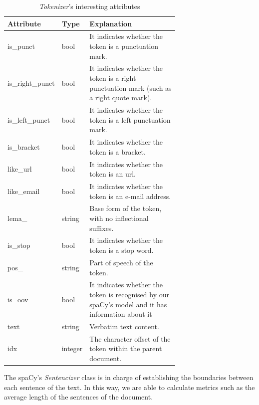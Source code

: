 \begin{table}[h]
	\begin{tabular}{|l|l|p{0.675\linewidth}|}
		\hline
		\textbf{Attribute} & \textbf{Type} & \textbf{Explanation}                                                                     \\ \hline
		is\_punct          & bool          & It indicates whether the token is a punctuation mark.                                    \\ \hline
		is\_right\_punct   & bool          & It indicates whether the token is a right punctuation mark (such as a right quote mark). \\ \hline
		is\_left\_punct    & bool          & It indicates whether the token is a left punctuation mark.                               \\ \hline
		is\_bracket        & bool          & It indicates whether the token is a bracket.                                             \\ \hline
		like\_url          & bool          & It indicates whether the token is an url.                                                \\ \hline
		like\_email        & bool          & It indicates whether the token is an e-mail address.                                     \\ \hline
		lema\_             & string        & Base form of the token, with no inflectional suffixes.                                   \\ \hline
		is\_stop           & bool          & It indicates whether the token is a stop word.                                           \\ \hline
		pos\_              & string        & Part of speech of the token.                                                             \\ \hline
		is\_oov			   & bool		   & It indicates whether the token is recognised by our spaCy's model and it has information about it\\ \hline
		text & string & Verbatim text content. \\ \hline
		idx & integer & The character offset of the token within the parent document. \\ \hline
	\end{tabular}
	\caption{\textit{Tokenizer}'s interesting attributes}\label{tab:attspacy}
\end{table}
 
 The spaCy's \textit{Sentencizer} class is in charge of establishing the boundaries between each sentence of the text. In this way, we are able to calculate metrics such as the average length of the sentences of the document.
